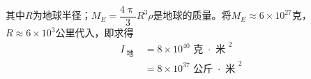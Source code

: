 其中$ R $为地球半径；$ M _ { E } = \dfrac { 4 \uppi } { 3 } R ^ { 3 } \rho $是地球的质量。将$ M _ { E } \approx
  6 \times 1 0 ^ { 2 7 } $克， $ R \approx 6 \times 1 0 ^ { 3 } $公里代入，即求得
\begin{equation*}
  \begin{split}
    I _ { \text { 地 } } &= 8 \times 1 0 ^ { 40 } \text{ 克 }\! \cdot\!\!\text{ 米 } ^ 2 \\
    &= 8 \times 1 0 ^ { 37 } \text{ 公斤 }\! \cdot\!\! \text{ 米 } ^ 2
  \end{split}
\end{equation*}
